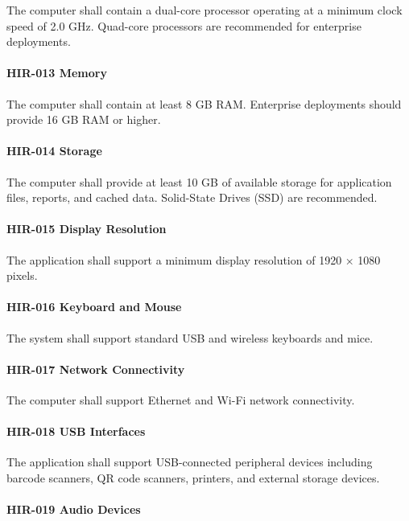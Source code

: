 The computer shall contain a dual-core processor operating at a minimum
clock speed of 2.0 GHz. Quad-core processors are recommended for
enterprise deployments.

\paragraph{HIR-013 Memory}

The computer shall contain at least 8 GB RAM. Enterprise deployments
should provide 16 GB RAM or higher.

\paragraph{HIR-014 Storage}

The computer shall provide at least 10 GB of available storage for
application files, reports, and cached data. Solid-State Drives (SSD)
are recommended.

\paragraph{HIR-015 Display Resolution}

The application shall support a minimum display resolution of
1920 × 1080 pixels.

\paragraph{HIR-016 Keyboard and Mouse}

The system shall support standard USB and wireless keyboards and mice.

\paragraph{HIR-017 Network Connectivity}

The computer shall support Ethernet and Wi-Fi network connectivity.

\paragraph{HIR-018 USB Interfaces}

The application shall support USB-connected peripheral devices including
barcode scanners, QR code scanners, printers, and external storage
devices.

\paragraph{HIR-019 Audio Devices}

